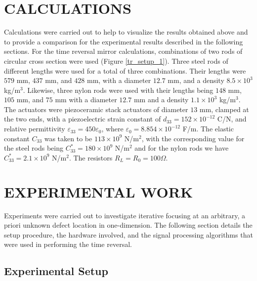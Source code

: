 \documentclass[11pt,letterpaper]{article}%
\begin{document}
\section{CALCULATIONS}
\label{sect:calc}

Calculations were carried out to help to visualize the
results obtained above and to provide a comparison for the
experimental results described in the following sections. For the
time reversal mirror calculations, combinations of two rods of circular
cross section were used (Figure \ref{tr_setup_1}). Three steel rods of different lengths were used for a total of three combinations. Their lengths
were $579$ mm, $437$ mm, and $428$ mm, with a diameter $12.7$ mm,
and a density $8.5 \times 10^3$ kg/m$^3$. Likewise, three nylon rods were used with their lengths being $148$ mm, $105$ mm, and $75$ mm with a diameter $12.7$ mm and a density $1.1 \times 10^3$ kg/m$^3$. The actuators were
piezoceramic stack actuators of diameter $13$ mm, clamped at the
two ends, with a piezoelectric strain constant of $d_{33} = 152
\times 10^{-12}$ C/N, and relative permittivity $\varepsilon_{33}
= 450 \varepsilon_0$, where $\varepsilon_0 = 8.854 \times
10^{-12}$ F/m. The elastic constant $C_{33}$ was taken to be $113
\times 10^9$ N/m$^2$, with the corresponding value for the steel
rods being $ C^\ast_{33} = 180 \times 10^9$ N/m$^2$ and for the nylon rods we have $ C^\ast_{33} = 2.1 \times 10^9$ N/m$^2$.  The
resistors $R_L = R_0 = 100 \Omega$.

\section{EXPERIMENTAL WORK}
\label{sect:expt}


Experiments were carried out to investigate iterative focusing at an arbitrary, a priori unknown defect location in one-dimension. The following section details the setup procedure, the hardware involved, and the signal processing algorithms that were used in performing the time reversal.

\subsection{Experimental Setup}
\label{sect:expSetup}
\end{document}

